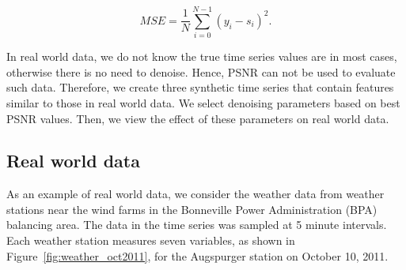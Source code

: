 \documentclass[11pt]{article}
\theoremstyle{definition}
\begin{document}
\begin{displaymath}
MSE = \frac{1}{N} \sum _{i = 0} ^{N - 1} \left( y_i - s_i \right) ^2.
\end{displaymath}


In real world data, we do not know the true time series values are in
most cases, otherwise there is no need to denoise. Hence, PSNR can not
be used to evaluate such data. Therefore, we create three synthetic
time series that contain features similar to those in real
world data. We select denoising parameters based on best PSNR values.
Then, we view the effect of these parameters on real world data.


\subsection{Real world data}

As an example of real world data, we consider the weather data from
weather stations near the wind farms in the Bonneville Power
Administration (BPA) balancing area. 
%
%
The data in the time series was sampled at 5 minute intervals. Each weather
station measures seven variables, as shown in 
%
Figure~\ref{fig:weather_oct2011}, for the Augspurger station on
October 10, 2011.
\end{document}
